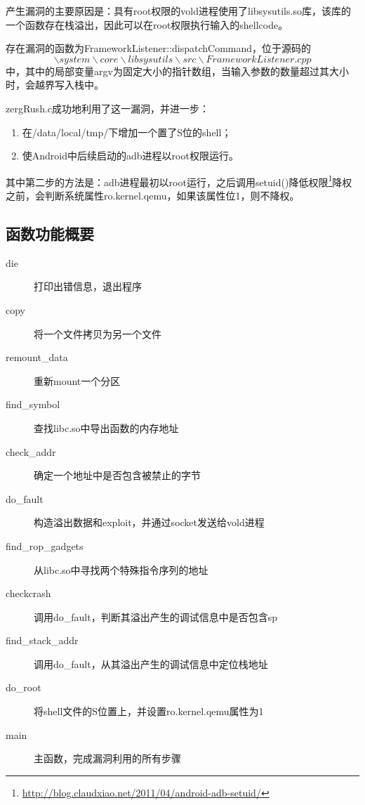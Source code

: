 产生漏洞的主要原因是：具有root权限的vold进程使用了libsysutils.so库，该库的一个函数存在栈溢出，因此可以在root权限执行输入的shellcode。

存在漏洞的函数为FrameworkListener::dispatchCommand，位于源码的$$\backslash system\backslash core\backslash libsysutils\backslash src\backslash FrameworkListener.cpp$$中，其中的局部变量argv为固定大小的指针数组，当输入参数的数量超过其大小时，会越界写入栈中。

zergRush.c成功地利用了这一漏洞，并进一步：
\begin{enumerate}
\item 在/data/local/tmp/下增加一个置了S位的shell；
\item 使Android中后续启动的adb进程以root权限运行。
\end{enumerate}

其中第二步的方法是：adb进程最初以root运行，之后调用setuid()降低权限\footnote{\url{http://blog.claudxiao.net/2011/04/android-adb-setuid/}}降权之前，会判断系统属性ro.kernel.qemu，如果该属性位1，则不降权。

\subsection{函数功能概要}

\begin{description}
\item[die] 打印出错信息，退出程序
\item[copy] 将一个文件拷贝为另一个文件
\item[remount\_data] 重新mount一个分区
\item[find\_symbol] 查找libc.so中导出函数的内存地址
\item[check\_addr] 确定一个地址中是否包含被禁止的字节
\item[do\_fault] 构造溢出数据和exploit，并通过socket发送给vold进程
\item[find\_rop\_gadgets] 从libc.so中寻找两个特殊指令序列的地址
\item[checkcrash] 调用do\_fault，判断其溢出产生的调试信息中是否包含sp
\item[find\_stack\_addr] 调用do\_fault，从其溢出产生的调试信息中定位栈地址
\item[do\_root] 将shell文件的S位置上，并设置ro.kernel.qemu属性为1
\item[main] 主函数，完成漏洞利用的所有步骤
\end{description}

